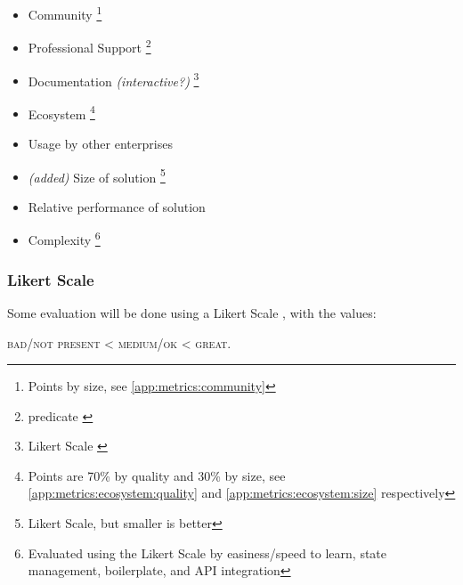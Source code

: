 \begin{itemize}
    \item Community \footnote{Points by size, see \ref{app:metrics:community}}
    \item Professional Support \footnote{\Gls{predicate} \label{fn:predicate}}
    \item Documentation \textit{(interactive?)} \footnote{Likert Scale \label{fn:likert_scale}}
    \item Ecosystem \footnote{Points are 70\% by quality and 30\% by size, see \ref{app:metrics:ecosystem:quality} and \ref{app:metrics:ecosystem:size} respectively}
    \item Usage by other enterprises 
    \item \textit{(added)} Size of solution \footnote{Likert Scale, but smaller is better}
    \item Relative performance of solution 
    \item Complexity \footnote{Evaluated using the Likert Scale by easiness/speed to learn, state management, boilerplate, and API integration}
\end{itemize}

\subsubsection{Likert Scale}

Some evaluation will be done using a Likert Scale \cite{enwiki:likert_scale}, with the values:

\begin{center}
    \textsc{bad/not present} < \textsc{medium/ok} < \textsc{great}.
\end{center}
